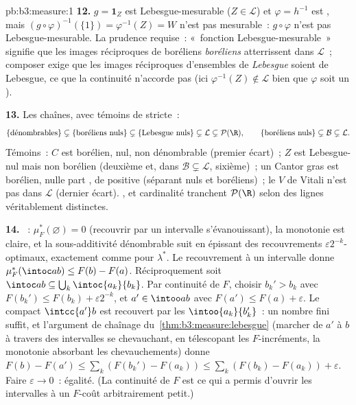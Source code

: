 \begin{solution}{pb:b3:measure:1}
\textbf{12.} $g = \mathbf 1_Z$ est Lebesgue-mesurable ($Z
\in \mathcal L$) et $\varphi = h^{-1}$ est , mais
$(g\circ\varphi)^{-1}(\{1\}) = \varphi^{-1}(Z) = W$ n'est
pas mesurable~: $g \circ \varphi$ n'est pas
Lebesgue-mesurable. La prudence requise~: «~fonction
Lebesgue-mesurable~» signifie que les images réciproques de
boréliens \emph{boréliens} atterrissent dans $\mathcal L$~;
composer exige que les images réciproques d'ensembles de
\emph{Lebesgue} soient de Lebesgue, ce que la continuité
n'accorde pas (ici $\varphi^{-1}(Z) \notin \mathcal L$ bien
que $\varphi$ soit un ).

\textbf{13.} Les chaînes, avec témoins de stricte~:
\[
\{\text{dénombrables}\} \subsetneq \{\text{boréliens nuls}\}
\subsetneq \{\text{Lebesgue nuls}\} \subsetneq \mathcal L
\subsetneq \mathcal P(\R),
\qquad
\{\text{boréliens nuls}\} \subsetneq \mathcal B \subsetneq
\mathcal L .
\]
Témoins~: $C$ est borélien, nul, non dénombrable (premier
écart)~; $Z$ est Lebesgue-nul mais non borélien (deuxième
et, dans $\mathcal B \subsetneq \mathcal L$, sixième)~; un
Cantor gras est borélien, nulle part , de 
positive (séparant nuls et boréliens)~; le $V$ de Vitali
n'est pas dans $\mathcal L$ (dernier écart). ,
 et cardinalité tranchent $\mathcal P(\R)$ selon
des lignes véritablement distinctes.

\textbf{14.} ~: $\mu_F^*(\varnothing) = 0$
(recouvrir par un intervalle s'évanouissant), la monotonie
est claire, et la sous-additivité dénombrable suit en
épissant des recouvrements $\varepsilon2^{-k}$-optimaux,
exactement comme pour $\lambda^*$. Le recouvrement à un
intervalle donne $\mu_F^*(\intoc ab) \leq F(b) - F(a)$.
Réciproquement soit $\intoc ab \subseteq
\bigcup_k\intoc{a_k}{b_k}$. Par continuité de $F$, choisir
$b_k' > b_k$ avec $F(b_k') \leq F(b_k) + \varepsilon2^{-k}$,
et $a' \in \intoo ab$ avec $F(a') \leq F(a) + \varepsilon$.
Le compact $\intcc{a'}b$ est recouvert par les 
$\intoo{a_k}{b_k'}$~: un nombre fini suffit, et l'argument
de chaînage du~\cref{thm:b3:measure:lebesgue} (marcher de
$a'$ à $b$ à travers des intervalles se chevauchant, en
télescopant les $F$-incréments, la monotonie absorbant les
chevauchements) donne $F(b) - F(a') \leq
\sum_k(F(b_k') - F(a_k)) \leq \sum_k(F(b_k) - F(a_k)) +
\varepsilon$. Faire $\varepsilon \to 0$~: égalité. (La
continuité de $F$ est ce qui a permis d'ouvrir les
intervalles à un $F$-coût arbitrairement petit.)


\end{solution}
